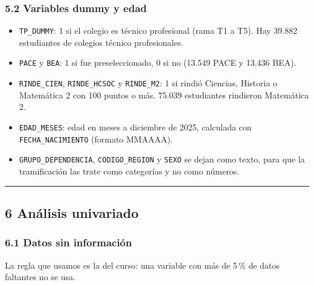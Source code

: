 \documentclass[11pt]{article}
\begin{document}
\subsubsection*{5.2 \; Variables dummy y edad}

\begin{itemize}[leftmargin=1.5em, itemsep=0.3em]
  \item \texttt{TP\_DUMMY}: 1 si el colegio es técnico profesional (rama
        T1 a T5). Hay 39.882 estudiantes de colegios técnico profesionales.
  \item \texttt{PACE} y \texttt{BEA}: 1 si fue preseleccionado, 0 si no
        (13.549 PACE y 13.436 BEA).
  \item \texttt{RINDE\_CIEN}, \texttt{RINDE\_HCSOC} y \texttt{RINDE\_M2}:
        1 si rindió Ciencias, Historia o Matemática 2 con 100 puntos o
        más. 75.039 estudiantes rindieron Matemática 2.
  \item \texttt{EDAD\_MESES}: edad en meses a diciembre de 2025, calculada
        con \texttt{FECHA\_NACIMIENTO} (formato MMAAAA).
  \item \texttt{GRUPO\_DEPENDENCIA}, \texttt{CODIGO\_REGION} y
        \texttt{SEXO} se dejan como texto, para que la tramificación las
        trate como categorías y no como números.
\end{itemize}

\medskip\hrule\medskip

\subsection*{6 \; Análisis univariado}

\subsubsection*{6.1 \; Datos sin información}

La regla que usamos es la del curso: una variable con más de 5\,\% de
datos faltantes no se usa.
\end{document}
